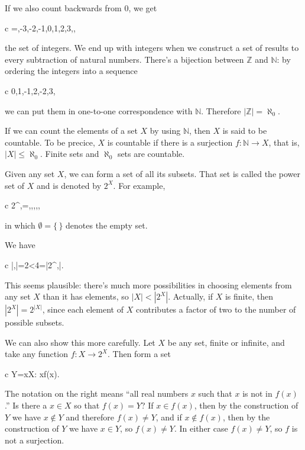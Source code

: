 \documentclass[11pt,oneside,%
]{memoir}
\newenvironment{eqna}{\begin{IEEEeqnarray}{c}}{\end{IEEEeqnarray}\ignorespacesafterend}
\newcommand{\NN}{\mathbb{N}}
\newcommand{\ZZ}{\mathbb{Z}}
\begin{document}
If we also count backwards from \(0\), we get
\begin{eqna}
    \ZZ=\lbrace\dotsc,-3,-2,-1,0,1,2,3,\dotsc\rbrace,
\end{eqna}
the set of integers. We end up with integers when we construct a set of results to every subtraction of natural numbers. There's a bijection between \(\ZZ\) and \(\NN\): by ordering the integers into a sequence
\begin{eqna}
    0,1,-1,2,-2,3,\dotsc
\end{eqna}
we can put them in one-to-one correspondence with \(\NN\). Therefore  \(|\ZZ|=\aleph_0\).

If we can count the elements of a set \(X\) by using \(\NN\), then \(X\) is said to be countable. To be precice, \(X\) is countable if there is a surjection \(f:\NN\rightarrow X\), that is, \(|X|\leq\aleph_0\). Finite sets and \(\aleph_0\) sets are countable.

Given any set \(X\), we can form a set of all its subsets. That set is called the power set of \(X\) and is denoted by \(2^X\). For example,
\begin{eqna}
    2^{\lbrace\uparrow,\downarrow\rbrace}=\lbrace\emptyset,\lbrace\uparrow\rbrace,\lbrace\downarrow\rbrace,\lbrace\uparrow,\downarrow\rbrace\rbrace,
\end{eqna}
in which \(\emptyset=\lbrace\,\rbrace\) denotes the empty set.

We have
\begin{eqna}
    |\lbrace\uparrow,\downarrow\rbrace|=2<4=|2^{\lbrace\uparrow,\downarrow\rbrace}|.
\end{eqna}
This seems plausible: there's much more possibilities in choosing elements from any set \(X\) than it has elements, so \(|X|<|2^X|\). Actually, if \(X\) is finite, then \(|2^X|=2^{|X|}\), since each element of \(X\) contributes a factor of two to the number of possible subsets.

We can also show this more carefully. Let \(X\) be any set, finite or infinite, and take any function \(f:X\rightarrow 2^X\). Then form a set
\begin{eqna}
    Y=\lbrace x\in X: x\notin f(x)\rbrace.
\end{eqna}
The notation on the right means ``all real numbers \(x\) such that \(x\) is not in \(f(x)\).'' Is there a \(x\in X\) so that \(f(x)=Y\)? If \(x\in f(x)\), then by the construction of \(Y\) we have \(x\notin Y\) and therefore \(f(x)\neq Y\), and if \(x\notin f(x)\), then by the construction of \(Y\) we have \(x\in Y\), so \(f(x)\neq Y\). In either case \(f(x)\neq Y\), so \(f\) is not a surjection.
\end{document}
